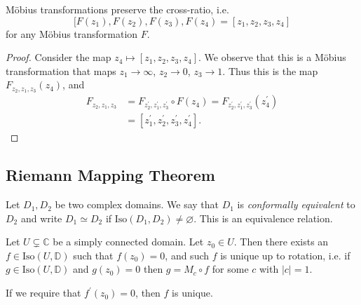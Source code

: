 \begin{theorem}
M\"obius transformations preserve the cross-ratio,
i.e.
$$
  [F(z_1), F(z_2), F(z_3), F(z_4)
= [z_1, z_2, z_3, z_4]
$$
for any M\"obius transformation $F$.
\end{theorem}
\begin{proof}
Consider the map $z_4 \mapsto [z_1, z_2, z_3, z_4]$.
We observe that this is a M\"obius transformation that maps
$z_1 \to \infty$, $z_2 \to 0$, $z_3 \to 1$. Thus this is the
map $F_{z_2, z_1, z_3} (z_4)$, and
\begin{align*}
   F_{z_2, z_1, z_3}
&= F_{z_2^\prime, z_1^\prime, z_3^\prime} \circ F(z_4)
 = F_{z_2^\prime, z_1^\prime, z_3^\prime}(z_4^\prime) \\
&= [z_1^\prime, z_2^\prime, z_3^\prime, z_4^\prime].
\end{align*}
\end{proof}

\subsection{Riemann Mapping Theorem}

\begin{defn}
Let $D_1, D_2$ be two complex domains. We say that
$D_1$ is \emph{conformally equivalent} to $D_2$ and write
$D_1 \simeq D_2$ if
$\mathrm{Iso}(D_1, D_2) \neq \varnothing$. This is
an equivalence relation.
\end{defn}

\begin{theorem}
Let $U \subsetneq \mathbb{C}$ be a simply connected domain.
Let $z_0 \in U$. Then there exists an
$f \in \mathrm{Iso}(U, \mathbb{D})$ such that $f(z_0) = 0$,
and such $f$ is unique up to rotation, i.e. if
$g \in \mathrm{Iso}(U, \mathbb{D})$ and $g(z_0) = 0$ then
$g = M_c \circ f$ for some $c$ with $|c| = 1$.

If we require that $f^\prime(z_0) = 0$, then $f$ is unique.
\end{theorem}
